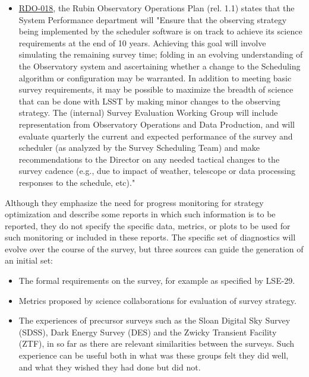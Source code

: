\begin{itemize}
\item \href{https://ls.st/rdo-018}{RDO-018}, the Rubin Observatory Operations Plan (rel. 1.1) states that the System Performance department will "Ensure that the observing strategy being implemented by the scheduler software is on track to achieve its science requirements at the end of 10 years. Achieving this goal will involve simulating the remaining survey time; folding in an evolving understanding of the Observatory system and ascertaining whether a change to the Scheduling algorithm or configuration may be warranted. In addition to meeting basic survey requirements, it may be possible to maximize the breadth of science that can be done with LSST by making minor changes to the observing strategy. The (internal) Survey Evaluation Working Group will include representation from Observatory Operations and Data Production, and will evaluate quarterly the current and expected performance of the survey and scheduler (as analyzed by the Survey Scheduling Team) and make recommendations to the Director on any needed tactical changes to the survey cadence (e.g., due to impact of weather, telescope or data processing responses to the schedule, etc)."
\end{itemize}

Although they emphasize the need for progress monitoring for strategy optimization and describe some reports in which such information is to be reported, they do not specify the specific data, metrics, or plots to be used for such monitoring or included in these reports.
The specific set of diagnostics will evolve over the course of the survey, but three sources can guide the generation of an initial set:
\begin{itemize}
\item The formal requirements on the survey, for example as specified by LSE-29.
\item Metrics proposed by science collaborations for evaluation of survey strategy.
\item The experiences of precursor surveys such as the Sloan Digital Sky Survey (SDSS), Dark Energy Survey (DES) and the Zwicky Transient Facility (ZTF), in so far as there are relevant similarities between the surveys. Such experience can be useful both in what was these groups felt they did well, and what they wished they had done but did not.
\end{itemize}

